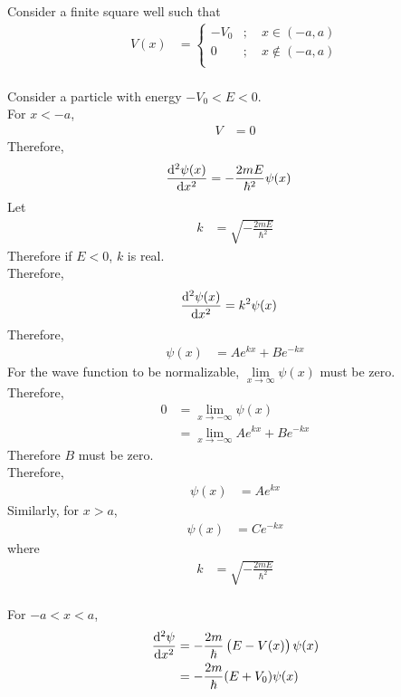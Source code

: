 \documentclass[titlepage, fleqn, a4paper, 12pt, twoside]{article}
\theoremstyle{definition}
\theoremstyle{theorem}
\begin{document}
Consider a finite square well such that
\begin{align*}
	V(x) &=
		\begin{cases}
			-V_0 &;\quad x \in (-a,a)\\
			0 &;\quad x \notin (-a,a)\\
		\end{cases}
\end{align*}
~\\
Consider a particle with energy $-V_0 < E < 0$.\\
For $x < -a$,
\begin{align*}
	V &= 0
\end{align*}
Therefore,
\begin{align*}
	\dod[2]{\psi(x)}{x} &= -\frac{2 m E}{\hbar^2} \psi(x)
\end{align*}
Let
\begin{align*}
	k &= \sqrt{-\frac{2 m E}{\hbar^2}}
\end{align*}
Therefore if $E < 0$, $k$ is real.\\
Therefore,
\begin{align*}
	\dod[2]{\psi(x)}{x} &= k^2 \psi(x)
\end{align*}
Therefore,
\begin{align*}
	\psi(x) &= A e^{k x} + B e^{-k x}
\end{align*}
For the wave function to be normalizable, $\lim\limits_{x \to \infty} \psi(x)$ must be zero.\\
Therefore,
\begin{align*}
	0 &= \lim\limits_{x \to -\infty} \psi(x)\\
	&= \lim\limits_{x \to -\infty} A e^{k x} + B e^{-k x}
\end{align*}
Therefore $B$ must be zero.\\
Therefore,
\begin{align*}
	\psi(x) &= A e^{k x}
\end{align*}
Similarly, for $x > a$,
\begin{align*}
	\psi(x) &= C e^{-k x}
\end{align*}
where
\begin{align*}
	k &= \sqrt{-\frac{2 m E}{\hbar^2}}
\end{align*}
~\\
For $-a < x < a$,
\begin{align*}
	\dod[2]{\psi}{x} &= -\frac{2 m}{\hbar} \left( E - V(x) \right) \psi(x)\\
	&= -\frac{2 m}{\hbar} (E + V_0) \psi(x)
\end{align*}
\end{document}

